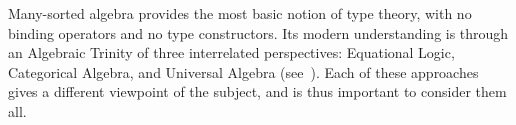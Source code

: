 \documentclass[11pt,twocolumn]{article}
\newcommand{\hide}[1]{}
\begin{document}
Many-sorted algebra provides the most basic notion of type theory, with no
binding operators and no type constructors.  Its modern understanding is
through an Algebraic Trinity of three interrelated perspectives:
Equational Logic, Categorical Algebra, and Universal Algebra
(see~\cite{Birkhoff,LawvereThesis,Linton}).
%
Each of these approaches %
gives a different viewpoint of the subject, and is thus important to consider
them all.  
%
\hide{For instance, Equational Logic provides the deductive system for formal
reasoning about equations from axioms; Universal Algebra provides a general
notion of model from which one derives an abstract notion of syntactic
structure by means of freely generated models; Categorical Algebra provides an
invariant notion of theory together with a notion of translation between them
that lifts to adjoint functors between categories of models.}
\end{document}
